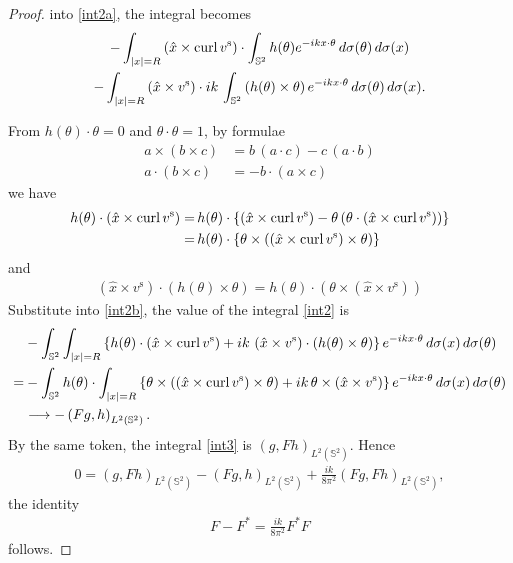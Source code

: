\begin{proof}
  into \eqref{int2a}, the integral becomes 
  \begin{multline}\label{int2b}
    -\int_{|x|=R}\left(\hat{x}\times\operatorname{curl}{v^\text{s}}\right)\cdot\int_{\mathbb{S}^2}h(\theta) e^{-i k x\cdot\theta}\, d\sigma(\theta)\,d\sigma(x) \\-\int_{|x|=R}\left(\hat{x}\times v^\text{s}\right)\cdot ik\, \int_{\mathbb{S}^2}\left(h(\theta)\times\theta\right) e^{-i k x\cdot\theta}\, d\sigma(\theta) \,d\sigma(x).
  \end{multline}

  From $h(\theta)\cdot\theta=0$ and $\theta\cdot\theta=1$, by formulae
  \begin{align*}
    a\times(b\times c) &= b\,(a\cdot c) - c\,(a\cdot b) \\
    a\cdot(b\times c) &= -b\cdot(a\times c) 
  \end{align*}
  we have  
  \begin{align*}
    h(\theta)\cdot\left(\hat{x}\times\operatorname{curl}{v^\text{s}}\right)=&\,h(\theta)\cdot\left\{\left(\hat{x}\times\operatorname{curl}{v^\text{s}}\right)-\theta\left(\theta\cdot\left(\hat{x}\times\operatorname{curl}{v^\text{s}}\right)\right)\right\} \\
    =&\,h(\theta)\cdot\left\{\theta\times\left(\left(\hat{x}\times\operatorname{curl}{v^\text{s}}\right)\times\theta\right)\right\} 
  \end{align*}
  and 
  \begin{align*}
    \left(\hat{x}\times v^\text{s}\right)\cdot\left(h(\theta)\times\theta\right) = h(\theta)\cdot\left(\theta\times\left(\hat{x}\times v^\text{s}\right)\right)
  \end{align*}
  Substitute into \eqref{int2b}, the value of the integral \eqref{int2} is  
  \begin{align*}
    &-\int_{\mathbb{S}^2}\int_{|x|=R} \left\{h(\theta)\cdot\left(\hat{x}\times\operatorname{curl}{v^\text{s}}\right)+ik\,\left(\hat{x}\times v^\text{s}\right)\cdot\left(h(\theta)\times\theta\right)\right\} e^{-i k x\cdot\theta}\,d\sigma(x)\,d\sigma(\theta) \\
    =&-\int_{\mathbb{S}^2}h(\theta)\cdot\int_{|x|=R}\left\{\theta\times\left(\left(\hat{x}\times\operatorname{curl}{v^\text{s}}\right)\times\theta\right) + ik\,\theta\times\left(\hat{x}\times v^\text{s}\right)\right\} e^{-i k x\cdot\theta}\,d\sigma(x)\,d\sigma(\theta) \\
    &\longrightarrow-\left(Fg, h\right)_{L^2(\mathbb{S}^2)}.
  \end{align*}
  By the same token, the integral \eqref{int3} is $\left(g, Fh\right)_{L^2(\mathbb{S}^2)}$. Hence
  \begin{align*}
    0 = \left(g, Fh\right)_{L^2(\mathbb{S}^2)} -\left(Fg, h\right)_{L^2(\mathbb{S}^2)} + \frac{ik}{8\pi^2}\left(Fg, Fh\right)_{L^2(\mathbb{S}^2)},
  \end{align*}
  the identity
  \begin{align*}
    F - F^* = \frac{ik}{8\pi^2} F^*F
  \end{align*}
  follows.
  

\end{proof}
